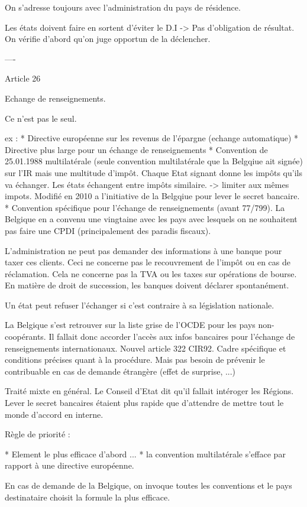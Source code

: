 \documentclass{book}
\begin{document}
On s'adresse toujours avec l'administration du pays de résidence.

Les états doivent faire en sortent d'éviter le D.I -> Pas d'obligation de résultat. On vérifie d'abord qu'on juge opportun de la déclencher.


----

Article 26

Echange de renseignements.

Ce n'est pas le seul.

ex : 
* Directive européenne sur les revenus de l'épargne (echange automatique)
* Directive plus large pour un échange de renseignements
* Convention de 25.01.1988 multilatérale (seule convention multilatérale que la Belgqiue ait signée) sur l'IR mais une multitude d'impôt. Chaque Etat signant donne les impôts qu'ils va échanger. Les états échangent entre impôts similaire. -> limiter aux mêmes impots. Modifié en 2010 a l'initiative de la Belgqiue pour lever le secret bancaire.
* Convention spécifique pour l'échange de renseignements (avant 77/799). La Belgique en a convenu une vingtaine avec les pays avec lesquels on ne souhaitent pas faire une CPDI (principalement des paradis fiscaux).

L'administration ne peut pas demander des informations à une banque pour taxer ces clients. Ceci ne concerne pas le recouvrement de l'impôt ou en cas de réclamation. Cela ne concerne pas la TVA ou les taxes sur opérations de bourse. En matière de droit de succession, les banques doivent déclarer spontanément.

Un état peut refuser l'échanger si c'est contraire à sa législation nationale.

La Belgique s'est retrouver sur la liste grise de l'OCDE pour les pays non-coopérants. Il fallait donc accorder l'accès aux infos bancaires pour l'échange de renseignements internationaux. Nouvel article 322 CIR92. Cadre spécifique et conditions précises quant à la procédure. Mais pas besoin de prévenir le contribuable en cas de demande étrangère (effet de surprise, ...)

Traité mixte en général. Le Conseil d'Etat dit qu'il fallait intéroger les Régions. Lever le secret bancaires étaient plus rapide que d'attendre de mettre tout le monde d'accord en interne.


Règle de priorité :

* Element le plus efficace d'abord ...
* la convention multilatérale s'efface par rapport à une directive européenne.

En cas de demande de la Belgique, on invoque toutes les conventions et le pays destinataire choisit la formule la plus efficace.
\end{document}
